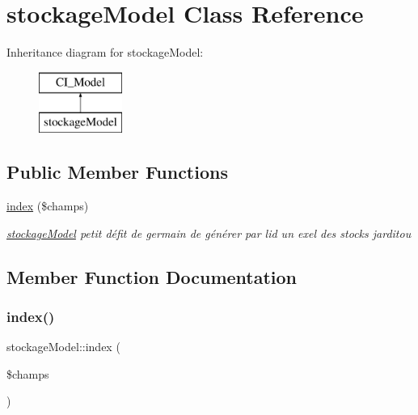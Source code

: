 \hypertarget{classstockage_model}{}\section{stockage\+Model Class Reference}
\label{classstockage_model}
Inheritance diagram for stockage\+Model\+:\begin{figure}[H]
\begin{center}
\leavevmode
\includegraphics[height=2.000000cm]{classstockage_model}
\end{center}
\end{figure}
\subsection*{Public Member Functions}
\begin{DoxyCompactItemize}
\item 
\mbox{\hyperlink{classstockage_model_ab1c812ef6b28967179e303a6541e345c}{index}} (\$champs)
\begin{DoxyCompactList}\small\item\em \mbox{\hyperlink{classstockage_model}{stockage\+Model}} petit défit de germain de générer par l\textquotesingle{}id un exel des stocks jarditou \end{DoxyCompactList}\end{DoxyCompactItemize}


\subsection{Member Function Documentation}
\mbox{\label{classstockage_model_ab1c812ef6b28967179e303a6541e345c}} 
\subsubsection{\texorpdfstring{index()}{index()}}
{\footnotesize\ttfamily stockage\+Model\+::index (\begin{DoxyParamCaption}\item[{}]{\$champs }\end{DoxyParamCaption})}



